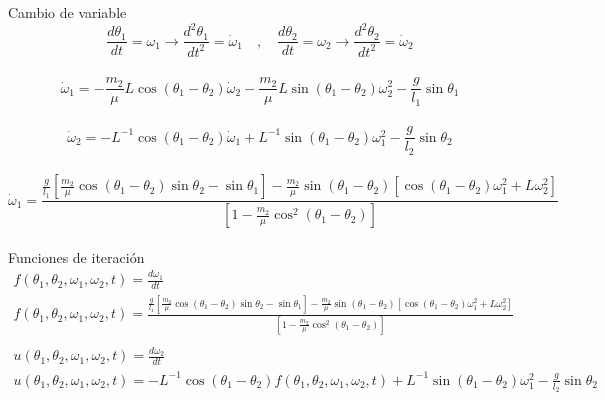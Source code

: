 \documentclass[10pt,a4papper]{article}
\begin{document}
\Large



\newpage
Cambio de variable
\[\frac{d\theta_1}{dt}=\omega_1\to\frac{d^2\theta_1}{dt^2}=\dot\omega_1\quad,\quad\frac{d\theta_2}{dt}=\omega_2\to\frac{d^2\theta_2}{dt^2}=\dot\omega_2\]\\
\[\dot\omega_1=-\frac{m_2}{\mu}L\cos(\theta_1-\theta_2)\dot\omega_2-\frac{m_2}{\mu}L\sin(\theta_1-\theta_2)\omega_2^2-\frac{g}{l_1}\sin\theta_1\]\\
\[\dot\omega_2=-L^{-1}\cos(\theta_1-\theta_2)\dot\omega_1+L^{-1}\sin(\theta_1-\theta_2)\omega_1^2-\frac{g}{l_2}\sin\theta_2\]\\
\[\dot\omega_1=\frac{\frac{g}{l_1}\left[\frac{m_2}{\mu}\cos(\theta_1-\theta_2)\sin\theta_2-\sin\theta_1\right]-\frac{m_2}{\mu}\sin(\theta_1-\theta_2)\left[\cos(\theta_1-\theta_2)\omega_1^2+L\omega_2^2\right]}{\left[1-\frac{m_2}{\mu}\cos^2(\theta_1-\theta_2)\right]}\]\\

\newpage
\Large
Funciones de iteración
\[\boxed{
  \begin{array}{lcl}
    f(\theta_1,\theta_2,\omega_1,\omega_2,t)=\frac{d\omega_1}{dt}\\
    f(\theta_1,\theta_2,\omega_1,\omega_2,t)=\frac{\frac{g}{l_1}\left[\frac{m_2}{\mu}\cos(\theta_1-\theta_2)\sin\theta_2-\sin\theta_1\right]-\frac{m_2}{\mu}\sin(\theta_1-\theta_2)\left[\cos(\theta_1-\theta_2)\omega_1^2+L\omega_2^2\right]}{\left[1-\frac{m_2}{\mu}\cos^2(\theta_1-\theta_2)\right]}\\\\
    u(\theta_1,\theta_2,\omega_1,\omega_2,t)=\frac{d\omega_2}{dt}\\
    u(\theta_1,\theta_2,\omega_1,\omega_2,t)=-L^{-1}\cos(\theta_1-\theta_2)f(\theta_1,\theta_2,\omega_1,\omega_2,t)+L^{-1}\sin(\theta_1-\theta_2)\omega_1^2-\frac{g}{l_2}\sin\theta_2
  \end{array}
}
\]\\\\
\end{document}
